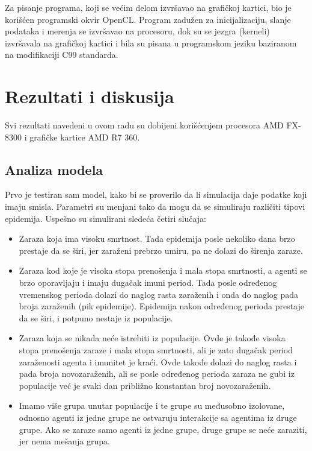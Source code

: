 Za pisanje programa, koji se većim delom izvršavao na grafičkoj kartici, bio je korišćen programski okvir OpenCL. Program zadužen za inicijalizaciju, slanje podataka i merenja se izvršavao na procesoru, dok su se jezgra (kerneli) izvršavala na grafičkoj kartici i bila su pisana u programskom jeziku baziranom na modifikaciji C99 standarda.

\section{Rezultati i diskusija}

Svi rezultati navedeni u ovom radu su dobijeni korišćenjem procesora AMD FX-8300 i grafičke kartice AMD R7 360.

\subsection{Analiza modela}

Prvo je testiran sam model, kako bi se proverilo da li simulacija daje podatke koji imaju smisla. Parametri su menjani tako da mogu da se simuliraju različiti tipovi epidemija. Uspešno su simulirani sledeća četiri slučaja:

\begin{itemize}
    \item Zaraza koja ima visoku smrtnost. Tada epidemija posle nekoliko dana brzo prestaje da se širi, jer zaraženi prebrzo umiru, pa ne dolazi do širenja zaraze.
    \item Zaraza kod koje je visoka stopa prenošenja i mala stopa smrtnosti, a agenti se brzo oporavljaju i imaju dugačak imuni period. Tada posle određenog vremenskog perioda dolazi do naglog rasta zaraženih i onda do naglog pada broja zaraženih (pik epidemije). Epidemija nakon određenog perioda prestaje da se širi, i potpuno nestaje iz populacije.
    \item Zaraza koja se nikada neće istrebiti iz populacije. Ovde je takođe visoka stopa prenošenja zaraze i mala stopa smrtnosti, ali je zato dugačak period zaraženosti agenta i imunitet je kraći. Ovde takođe dolazi do naglog rasta i pada broja novozaraženih, ali se posle određenog perioda zaraza ne gubi iz populacije već je svaki dan približno konstantan broj novozaraženih.
    \item Imamo više grupa unutar populacije i te grupe su međusobno izolovane, odnosno agenti iz jedne grupe ne ostvaruju interakcije sa agentima iz druge grupe. Ako se zaraze samo agenti iz jedne grupe, druge grupe se neće zaraziti, jer nema mešanja grupa.
\end{itemize}

